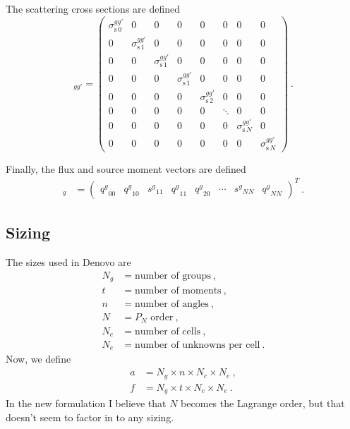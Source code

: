 \documentclass[12pt,twoside]{article}
\newcommand{\ve}[1]{\ensuremath{\mathbf{#1}}}
\newcommand{\sigg}[1]{\ensuremath{\sigma^{gg'}_{\text{s}\,#1}}}
\newcommand{\qe}{\ensuremath{q^g}}
\newcommand{\qo}{\ensuremath{s^g}}
\begin{document}
%
The scattering cross sections are defined
\begin{equation}
  [\ve{S}]_{gg'} = \begin{pmatrix}
    \sigg{0} & 0 & 0 & 0 & 0 & 0 & 0 & 0 \\
    0 & \sigg{1} & 0 & 0 & 0 & 0 & 0 & 0 \\
    0 & 0 & \sigg{1} & 0 & 0 & 0 & 0 & 0 \\
    0 & 0 & 0 & \sigg{1} & 0 & 0 & 0 & 0 \\
    0 & 0 & 0 & 0 & \sigg{2} & 0 & 0 & 0 \\
    0 & 0 & 0 & 0 & 0 & \ddots   & 0 & 0 \\
    0 & 0 & 0 & 0 & 0 & 0 & \sigg{N} & 0 \\
    0 & 0 & 0 & 0 & 0 & 0 & 0 & \sigg{N}
  \end{pmatrix}\:.
\end{equation}

Finally, the flux and source moment vectors are defined
\begin{align}
  [q_e]_g &= \begin{pmatrix}
    \qe_{00} & \qe_{10} & \qo_{11} & \qe_{11} & \qe_{20}
    & \cdots & \qo_{NN} & \qe_{NN}
  \end{pmatrix}^T\:.
\end{align}

\subsection*{Sizing}
The sizes used in Denovo are
\begin{equation}
  \begin{aligned}
    N_g &= \text{number of groups}\:,\\
    t   &= \text{number of moments}\:,\\
    n   &= \text{number of angles}\:,\\
    N   &= \text{$P_N$ order}\:,\\
    N_c &= \text{number of cells}\:,\\
    N_e &= \text{number of unknowns per cell}\:.
  \end{aligned}
\end{equation}
Now, we define
\begin{align}
  a &= N_g\times n\times N_c\times N_e\:,\\
  f &= N_g\times t\times N_c\times N_e\:.
\end{align}
In the new formulation I believe that $N$ becomes the Lagrange order, but that doesn't seem to factor in to any sizing.
\end{document}
